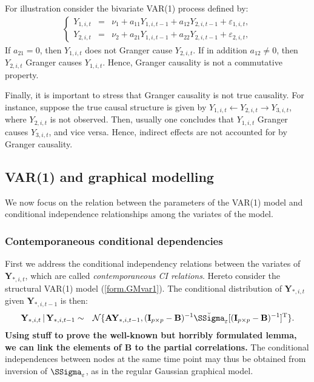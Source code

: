 \documentclass[a4paper]{article}
\theoremstyle{myexamplestyle}
\def\reminder#1{\marginpar{\rule[0pt]{1mm}{11pt}}\textbf{#1}}
\begin{document}
For illustration consider the bivariate VAR(1) process defined by:
\begin{eqnarray*}
\left\{
\begin{array}{ccc}
Y_{1,i,t} & = & \nu_1 + a_{11} Y_{1,i,t-1} + a_{12} Y_{2,i,t-1} + \varepsilon_{1,i,t},
\\
Y_{2,i,t} & = & \nu_2 + a_{21} Y_{1,i,t-1} + a_{22} Y_{2,i,t-1} + \varepsilon_{2,i,t},
\end{array}
\right.
\end{eqnarray*}
If $a_{21} = 0$, then $Y_{1, i, t}$ does not Granger cause $Y_{2, i, t}$. If in addition $a_{12} \not=0$, then $Y_{2, i, t}$ Granger causes $Y_{1, i, t}$. Hence, Granger causality is not a commutative property.

Finally, it is important to stress that Granger causality is not true causality. For instance, suppose the true causal structure is given by $Y_{1, i, t} \leftarrow Y_{2, i, t} \rightarrow Y_{3, i, t}$, where $Y_{2, i, t}$ is not observed. Then, usually one concludes that $Y_{1, i, t}$ Granger causes $Y_{3, i, t}$, and vice versa. Hence, indirect effects are not accounted for by Granger causality.




\subsection{VAR(1) and graphical modelling}
We now focus on the relation between the parameters of the VAR(1) model and conditional independence relationships among the variates of the model.

\subsubsection{Contemporaneous conditional dependencies}
First we address the conditional independency relations between the variates of $\mathbf{Y}_{\ast, i, t}$, which are called \textit{contemporaneous CI relations}. Hereto consider the structural VAR(1) model (\ref{form.GMvar1}). The conditional distribution of $\mathbf{Y}_{\ast, i, t}$ given $\mathbf{Y}_{\ast, i, t-1}$ is then:
\begin{eqnarray*}
\mathbf{Y}_{\ast, i, t} \, | \, \mathbf{Y}_{\ast, i, t-1}  & \sim & \mathcal{N} \{ \mathbf{A} \mathbf{Y}_{\ast, i, t-1},  (\mathbf{I}_{p \times p} - \mathbf{B})^{-1} \breve{\SSigma}_{\varepsilon}
[(\mathbf{I}_{p \times p} - \mathbf{B})^{-1}]^{\mathrm{T}} \}.
\end{eqnarray*}
\reminder{Using stuff to prove the well-known but horribly formulated lemma, we can link the elements of $\mathbf{B}$ to the partial correlations.} The conditional independences between nodes at the same time point may thus be obtained from inversion of $\SSigma_{\varepsilon}$, as in the regular Gaussian graphical model.
\end{document}
